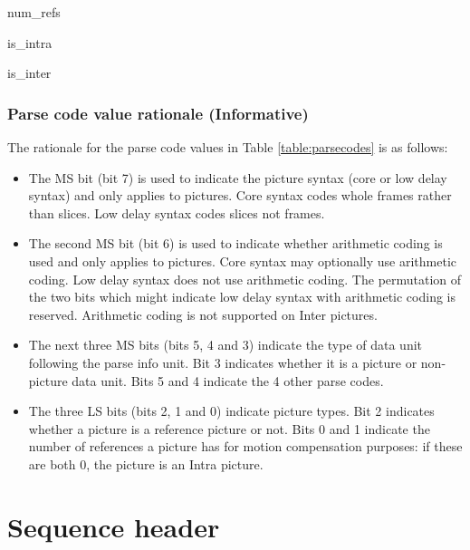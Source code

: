 \begin{pseudo}{num\_refs}{}
\end{pseudo}

\begin{pseudo}{is\_intra}{}
\end{pseudo}

\begin{pseudo}{is\_inter}{}
\end{pseudo}

\begin{informative*}
\subsubsection{Parse code value rationale (Informative)}

The rationale for the parse code values in Table \ref{table:parsecodes} is as follows:
\begin{itemize}
\item The MS bit (bit 7) is used to indicate the picture syntax (core or low delay syntax) 
and only applies to pictures. Core syntax codes whole frames rather than slices. Low delay syntax codes slices not frames. 
\item The second MS bit (bit 6) is used to indicate whether arithmetic coding is used and only applies to pictures. Core syntax may optionally use arithmetic coding. Low delay syntax does not use arithmetic coding. The permutation of the two bits which might indicate low delay syntax with arithmetic coding is reserved. Arithmetic coding is not supported on
Inter pictures.
\item The next three MS bits (bits 5, 4 and 3) indicate the type of data unit following the parse info unit. Bit 3 indicates whether it is a picture or non-picture data unit. Bits 5 and 4 indicate the 4 other parse codes.
\item The three LS bits (bits 2, 1 and 0) indicate picture types. Bit 2 indicates whether a picture
is a reference picture or not. Bits 0 and 1 indicate the number of references a picture has
for motion compensation purposes: if these are both 0, the picture is an Intra picture.
\end{itemize}

\end{informative*}

\clearpage
\section{Sequence header}
\label{sequenceheader}

